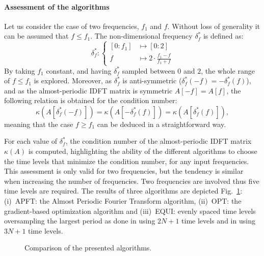 \paragraph{Assessment of the algorithms}

Let us consider the case of two frequencies, $f_1$ and $f$. 
Without loss of generality it can be assumed that $f \leq f_1$.
The non-dimensional frequency $\delta_f^*$ is defined as:
\begin{equation}
    \delta_f^* \colon\begin{cases}
        [0: f_1] & \longmapsto[0: 2]\\
        f & \longmapsto 2 \cdot \displaystyle \frac{f_1 - f}{f_1 + f}
    \end{cases}
    \label{eq:delta_f}
\end{equation}
By taking $f_1$ constant, and having $\delta_f^*$ sampled between $0$
and $2$, the whole range of $f \leq f_1$ is explored. Moreover, as
$\delta_f^*$ is anti-symmetric ($\delta_f^*(-f) = - \delta_f^*(f)$), 
and as the almost-periodic IDFT matrix is symmetric $A[-f] = A[f]$, 
the following relation is obtained for the condition number:
\begin{equation}
  \kappa \left(A \left[\delta_f^*\left(-f\right)\right]\right) =
  \kappa \left(A \left[-\delta_f^*\left(f\right)\right]\right) 
  = \kappa \left(A \left[\delta_f^*\left(f\right)\right]\right),
  \label{eq:permutation}
\end{equation}
meaning that the case $f\geq f_1$ can be deduced in a straightforward
way.

For each value of $\delta_f^*$, the condition number of the
almost-periodic IDFT matrix $\kappa ( A )$ is computed, highlighting
the ability of the different algorithms to choose the time levels that
minimize the condition number, for any input frequencies. This
assessment is only valid for two frequencies, but the tendency is similar
when increasing the number of frequencies. Two frequencies are
involved thus five time levels are required. The results of three
algorithms are depicted Fig.~\ref{fig:bench_algo}: (i)~APFT: the
Almost Periodic Fourier Transform algorithm, (ii)~OPT: the
gradient-based optimization algorithm and (iii)~EQUI: evenly spaced
time levels oversampling the largest period as done in
\citet{Gopinath2007} using $2N+1$ time
levels and in \citet{Ekici2007, Ekici2008} using $3N+1$
time levels.
\begin{figure}[htb]
  \centering 
    \quad{}
  \caption{Comparison of the presented algorithms.}
  \label{fig:bench_algo}
\end{figure}

